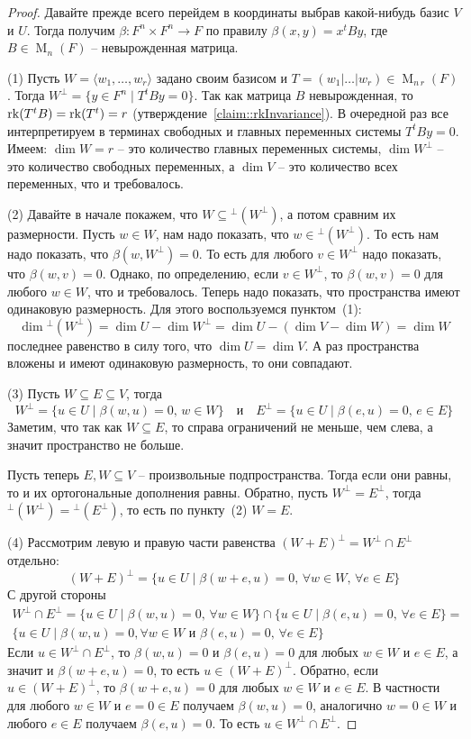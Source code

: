 \begin{proof}
Давайте прежде всего перейдем в координаты выбрав какой-нибудь базис $V$ и $U$. Тогда получим $\beta\colon F^n \times F^n \to F$ по правилу $\beta(x,y) = x^t B y$, где $B\in \operatorname{M}_n(F)$ -- невырожденная матрица.

(1) Пусть $W = \langle w_1,\ldots,w_r \rangle$ задано своим базисом и $T = (w_1|\ldots|w_r)\in \operatorname{M}_{n\,r}(F)$. Тогда $W^\bot = \{y\in F^n \mid T^tB y = 0\}$. Так как матрица $B$ невырожденная, то $\operatorname{rk}(T^t B) = \operatorname{rk} (T^t) = r$ (утверждение~\ref{claim::rkInvariance}). В очередной раз все интерпретируем в терминах свободных и главных переменных системы $T^t By = 0$. Имеем: $\dim W = r$ -- это количество главных переменных системы, $\dim W^\bot$ -- это количество свободных переменных, а $\dim V$ -- это количество всех переменных, что и требовалось.

(2) Давайте в начале покажем, что $W \subseteq {}^\bot(W^\bot)$, а потом сравним их размерности. Пусть $w\in W$, нам надо показать, что $w\in {}^\bot (W^\bot)$. То есть нам надо показать, что $\beta(w, W^\bot) = 0$. То есть для любого $v\in W^\bot$ надо показать, что $\beta(w,v) = 0$. Однако, по определению, если $v\in W^\bot$, то $\beta(w, v) = 0$ для любого $w\in W$, что и требовалось. Теперь надо показать, что пространства имеют одинаковую размерность. Для этого воспользуемся пунктом~(1):
\[
\dim {}^\bot (W^\bot) = \dim U - \dim W^\bot = \dim U- (\dim V - \dim W) = \dim W
\]
последнее равенство в силу того, что $\dim U = \dim V$. А раз пространства вложены и имеют одинаковую размерность, то они совпадают.

(3) Пусть $W\subseteq E\subseteq V$, тогда
\[
W^\bot = \{u\in U\mid \beta(w, u) = 0,\,w\in W\} \quad \text{и} \quad E^\bot = \{u\in U\mid \beta(e, u) = 0,\,e\in E\}
\]
Заметим, что так как $W\subseteq E$, то справа ограничений не меньше, чем слева, а значит пространство не больше.

Пусть теперь $E, W\subseteq V$ -- произвольные подпространства. Тогда если они равны, то и их ортогональные дополнения равны. Обратно, пусть $W^\bot = E^\bot$, тогда ${}^\bot(W^\bot) = {}^\bot(E^\bot)$, то есть по пункту~(2) $W = E$.

(4) Рассмотрим левую и правую части равенства $(W + E)^\bot = W^\bot\cap E^\bot$ отдельно:
\[
(W+E)^\bot = \{u\in U\mid \beta(w + e, u) = 0,\,\forall w\in W,\,\forall e\in E\}
\]
С другой стороны
\begin{gather*}
W^\bot\cap E^\bot = \{u\in U\mid \beta(w, u) = 0,\,\forall w\in W\}\cap \{u\in U\mid \beta(e,u) = 0,\,\forall e\in E\} =\\
\{u\in U\mid \beta(w,u) = 0,\forall w\in W\text{ и }\beta(e,u)=0,\,\forall e\in E\}
\end{gather*}
Если $u\in W^\bot\cap E^\bot$, то $\beta(w,u) = 0$ и $\beta(e,u) = 0$ для любых $w\in W$ и $e\in E$, а значит и $\beta(w + e, u) = 0$, то есть $u\in (W+E)^\bot$. Обратно, если $u\in (W+E)^\bot$, то $\beta(w+e,u) = 0$ для любых $w\in W$ и $e\in E$. В частности для любого $w\in W$ и $e = 0\in E$ получаем $\beta(w, u) = 0$, аналогично $w = 0\in W$ и любого $e \in E$ получаем $\beta(e, u) = 0$. То есть $u\in W^\bot\cap E^\bot$.


\end{proof}
